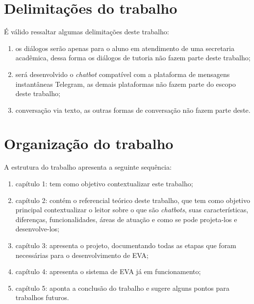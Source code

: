 
\section{Delimitações do trabalho}\label{cap:01:sec:03:delimitacao}

É válido ressaltar algumas delimitações deste trabalho:

\begin{enumerate}[label=\alph*)]
\tightlist
    \item os diálogos serão apenas para o aluno em atendimento de uma secretaria acadêmica, dessa forma os diálogos de tutoria não fazem parte deste trabalho;
    \item será desenvolvido o \textit{chatbot} compatível com a plataforma de mensagens instantâneas Telegram, as demais plataformas não fazem parte do escopo deste trabalho;
    \item conversação via texto, as outras formas de conversação não fazem parte deste.
\end{enumerate}

\section{Organização do trabalho}

A estrutura do trabalho apresenta a seguinte sequência:

\begin{enumerate}[label=\alph*)]
\tightlist
    \item capítulo 1: tem como objetivo contextualizar este trabalho; 
    \item capítulo 2: contém o referencial teórico deste trabalho, que tem como objetivo principal contextualizar o leitor sobre o que são \textit{chatbots}, suas características, diferenças, funcionalidades, áreas de atuação e como se pode projeta-los e desenvolve-los;
    \item capítulo 3: apresenta o projeto, documentando todas as etapas que foram necessárias para o desenvolvimento de EVA;
    \item capítulo 4: apresenta o sistema de EVA já em funcionamento;
    \item capítulo 5: aponta a conclusão do trabalho e sugere alguns pontos para trabalhos futuros.
\end{enumerate}

